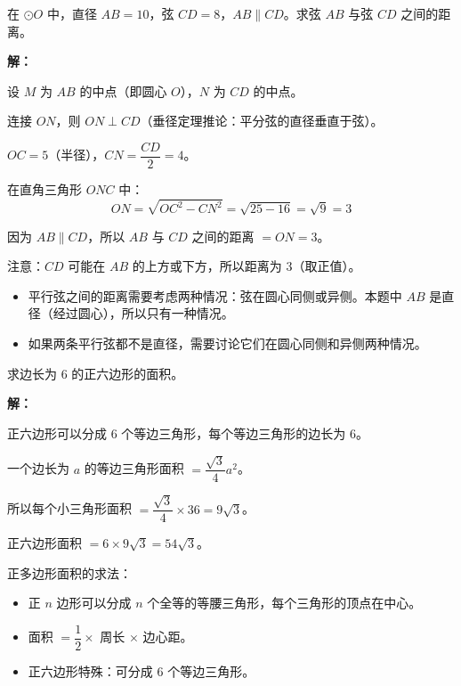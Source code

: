 \documentclass[12pt, a4paper]{ctexart}
\begin{document}
\vspace{6pt}

\begin{examplebox}
在 $\odot O$ 中，直径 $AB = 10$，弦 $CD = 8$，$AB \parallel CD$。求弦 $AB$ 与弦 $CD$ 之间的距离。
\end{examplebox}

\textbf{解：}

设 $M$ 为 $AB$ 的中点（即圆心 $O$），$N$ 为 $CD$ 的中点。

连接 $ON$，则 $ON \perp CD$（垂径定理推论：平分弦的直径垂直于弦）。

$OC = 5$（半径），$CN = \dfrac{CD}{2} = 4$。

在直角三角形 $ONC$ 中：
\[
ON = \sqrt{OC^2 - CN^2} = \sqrt{25 - 16} = \sqrt{9} = 3
\]

因为 $AB \parallel CD$，所以 $AB$ 与 $CD$ 之间的距离 $= ON = 3$。

注意：$CD$ 可能在 $AB$ 的上方或下方，所以距离为 $3$（取正值）。

\begin{warnbox}[注意]
\begin{itemize}[nosep]
  \item 平行弦之间的距离需要考虑两种情况：弦在圆心同侧或异侧。本题中 $AB$ 是直径（经过圆心），所以只有一种情况。
  \item 如果两条平行弦都不是直径，需要讨论它们在圆心同侧和异侧两种情况。
\end{itemize}
\end{warnbox}

\vspace{6pt}

\begin{examplebox}
求边长为 $6$ 的正六边形的面积。
\end{examplebox}

\textbf{解：}

正六边形可以分成 $6$ 个等边三角形，每个等边三角形的边长为 $6$。

一个边长为 $a$ 的等边三角形面积 $= \dfrac{\sqrt{3}}{4}a^2$。

所以每个小三角形面积 $= \dfrac{\sqrt{3}}{4} \times 36 = 9\sqrt{3}$。

正六边形面积 $= 6 \times 9\sqrt{3} = 54\sqrt{3}$。

\begin{tipbox}[方法总结]
正多边形面积的求法：
\begin{itemize}[nosep]
  \item 正 $n$ 边形可以分成 $n$ 个全等的等腰三角形，每个三角形的顶点在中心。
  \item 面积 $= \dfrac{1}{2} \times$ 周长 $\times$ 边心距。
  \item 正六边形特殊：可分成 $6$ 个等边三角形。
\end{itemize}
\end{tipbox}
\end{document}
